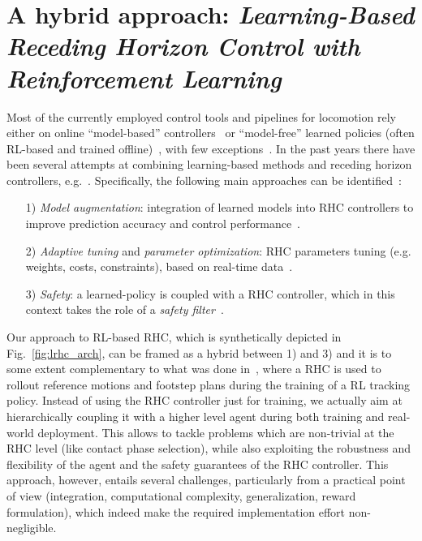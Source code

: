 \section{A hybrid approach: \textnormal{\textit{Learning-Based Receding Horizon Control with Reinforcement Learning}}}
Most of the currently employed control tools and pipelines for locomotion rely either on online ``model-based'' controllers~\cite{modern_mpc:grandia2023perceptive,web::atlas_grip_boston_dyn} or ``model-free'' learned policies (often RL-based and trained offline)~\cite{mpc_learn:aswani2012provably, mpc_learn:terzi2018learning, mpc_learn:soloperto2018learning, rl:schneider2023learning, rl:miki2024learning,mpc_learn:berkenkamp2016safe,mpc_learn:marco2016automatic,mpc_learn:brunner2015stabilizing,mpc_learn:rosolia2019learning,mpc_learn:englert2017inverse,mpc_learn:koller2018learning,mpc_learn:wabersich2021probabilistic,mpc_learn:gillulay2011guaranteed,mpc_learn:wabersich2018safe,mpc_learn:berkenkamp2017safe}, with few exceptions~\cite{hybrid_rl_to:Jenelten_2024}.
In the past years there have been several attempts at combining learning-based methods and receding horizon controllers, e.g.~\cite{mpc_learn:tsounis2020deepgait,mpc_learn:gangapurwala2021real}. Specifically, the following main approaches can be identified~\cite{mpc_learn:hewing2020learning}:
\begin{itemize}
	\item[1)] \textit{Model augmentation}: integration of learned models into RHC controllers to improve prediction accuracy and control performance~\cite{mpc_learn:aswani2012provably,mpc_learn:terzi2018learning,mpc_learn:soloperto2018learning}.
	\item[2)] \textit{Adaptive tuning} and \textit{parameter optimization}: RHC parameters tuning (e.g. weights, costs, constraints), based on real-time data~\cite{mpc_learn:berkenkamp2016safe,mpc_learn:marco2016automatic,mpc_learn:brunner2015stabilizing,mpc_learn:englert2017inverse,mpc_learn:rosolia2019learning,mpc_learn:romero2023actor}.
	\item[3)] \textit{Safety}: a learned-policy is coupled with a RHC controller, which in this context takes the role of a \textit{safety filter}~\cite{mpc_learn:koller2018learning,mpc_learn:wabersich2021probabilistic,mpc_learn:gillulay2011guaranteed,mpc_learn:wabersich2018safe,mpc_learn:berkenkamp2017safe}.
\end{itemize}
Our approach to RL-based RHC, which is synthetically depicted in Fig.~\ref{fig:lrhc_arch}, can be framed as a hybrid between 1) and 3) and it is to some extent complementary to what was done in~\cite{mpc_learn:hewing2020learning}, where a RHC is used to rollout reference motions and footstep plans during the training of a RL tracking policy. Instead of using the RHC controller just for training, we actually aim at hierarchically coupling it with a higher level agent during both training and real-world deployment. This allows to tackle problems which are non-trivial at the RHC level (like contact phase selection), while also exploiting the robustness and flexibility of the agent and the safety guarantees of the RHC controller. 
This approach, however, entails several challenges, particularly from a practical point of view (integration, computational complexity, generalization, reward formulation), which indeed make the required implementation effort non-negligible. 